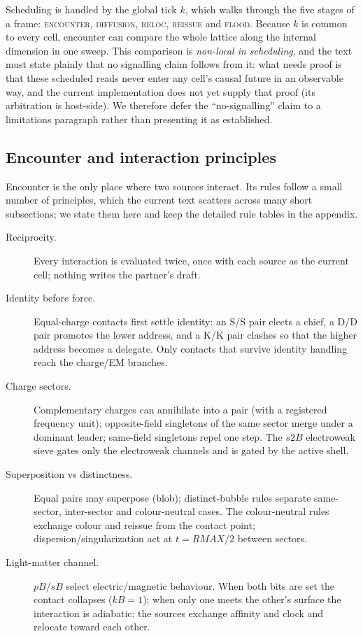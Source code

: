 Scheduling is handled by the global tick $k$, which walks through the five
stages of a frame: \textsc{encounter}, \textsc{diffusion}, \textsc{reloc},
\textsc{reissue} and \textsc{flood}.  Because $k$ is common to every cell,
encounter can compare the whole lattice along the internal dimension in one
sweep.  This comparison is \emph{non-local in scheduling}, and the text must
state plainly that no signalling claim follows from it: what needs proof is
that these scheduled reads never enter any cell's causal future in an
observable way, and the current implementation does not yet supply that proof
(its arbitration is host-side).  We therefore defer the ``no-signalling''
claim to a limitations paragraph rather than presenting it as established.

\subsection{Encounter and interaction principles}
\label{subsec:encounter-demo}

Encounter is the only place where two sources interact.  Its rules follow a
small number of principles, which the current text scatters across many short
subsections; we state them here and keep the detailed rule tables in the
appendix.

\begin{description}
\item[Reciprocity.]  Every interaction is evaluated twice, once with each
      source as the current cell; nothing writes the partner's draft.
\item[Identity before force.]  Equal-charge contacts first settle identity:
      an S/S pair elects a chief, a D/D pair promotes the lower address, and
      a K/K pair clashes so that the higher address becomes a delegate.  Only
      contacts that survive identity handling reach the charge/EM branches.
\item[Charge sectors.]  Complementary charges can annihilate into a
      pair (with a registered frequency unit); opposite-field singletons of
      the same sector merge under a dominant leader; same-field singletons
      repel one step.  The $s2B$ electroweak sieve gates only the
      electroweak channels and is gated by the active shell.
\item[Superposition vs distinctness.]  Equal pairs may superpose (blob);
      distinct-bubble rules separate same-sector, inter-sector and
      colour-neutral cases.  The colour-neutral rules exchange colour and
      reissue from the contact point; dispersion/singularization act at
      $t=RMAX/2$ between sectors.
\item[Light-matter channel.]  $pB$/$sB$ select electric/magnetic behaviour.
      When both bits are set the contact collapses ($kB=1$); when only one
      meets the other's surface the interaction is adiabatic: the sources
      exchange affinity and clock and relocate toward each other.
\end{description}


